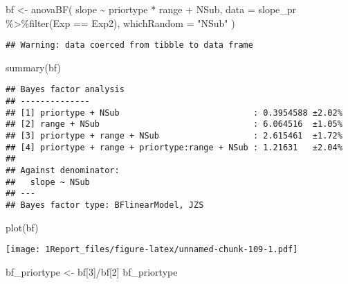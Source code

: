 \documentclass[
]{article}
\newenvironment{Shaded}{\begin{snugshade}}{\end{snugshade}}
\newcommand{\AttributeTok}[1]{\textcolor[rgb]{0.77,0.63,0.00}{#1}}
\newcommand{\DecValTok}[1]{\textcolor[rgb]{0.00,0.00,0.81}{#1}}
\newcommand{\FunctionTok}[1]{\textcolor[rgb]{0.00,0.00,0.00}{#1}}
\newcommand{\NormalTok}[1]{#1}
\newcommand{\OtherTok}[1]{\textcolor[rgb]{0.56,0.35,0.01}{#1}}
\newcommand{\SpecialCharTok}[1]{\textcolor[rgb]{0.00,0.00,0.00}{#1}}
\newcommand{\StringTok}[1]{\textcolor[rgb]{0.31,0.60,0.02}{#1}}
\begin{document}
\begin{Shaded}
\begin{Highlighting}[]
\NormalTok{bf }\OtherTok{\textless{}{-}} \FunctionTok{anovaBF}\NormalTok{( slope }\SpecialCharTok{\textasciitilde{}}\NormalTok{ priortype }\SpecialCharTok{*}\NormalTok{ range }\SpecialCharTok{+}\NormalTok{ NSub, }\AttributeTok{data =}\NormalTok{ slope\_pr }\SpecialCharTok{\%\textgreater{}\%}\FunctionTok{filter}\NormalTok{(Exp }\SpecialCharTok{==} \StringTok{\textquotesingle{}Exp2\textquotesingle{}}\NormalTok{), }\AttributeTok{whichRandom =} \StringTok{"NSub"}\NormalTok{ ) }
\end{Highlighting}
\end{Shaded}

\begin{verbatim}
## Warning: data coerced from tibble to data frame
\end{verbatim}

\begin{Shaded}
\begin{Highlighting}[]
\FunctionTok{summary}\NormalTok{(bf)}
\end{Highlighting}
\end{Shaded}

\begin{verbatim}
## Bayes factor analysis
## --------------
## [1] priortype + NSub                           : 0.3954588 ±2.02%
## [2] range + NSub                               : 6.064516  ±1.05%
## [3] priortype + range + NSub                   : 2.615461  ±1.72%
## [4] priortype + range + priortype:range + NSub : 1.21631   ±2.04%
## 
## Against denominator:
##   slope ~ NSub 
## ---
## Bayes factor type: BFlinearModel, JZS
\end{verbatim}

\begin{Shaded}
\begin{Highlighting}[]
\FunctionTok{plot}\NormalTok{(bf)}
\end{Highlighting}
\end{Shaded}

\texttt{[image: 1Report\_files/figure-latex/unnamed-chunk-109-1.pdf]}

\begin{Shaded}
\begin{Highlighting}[]
\NormalTok{ bf\_priortype }\OtherTok{\textless{}{-}}\NormalTok{ bf[}\DecValTok{3}\NormalTok{]}\SpecialCharTok{/}\NormalTok{bf[}\DecValTok{2}\NormalTok{]}
\NormalTok{ bf\_priortype}
\end{Highlighting}
\end{Shaded}
\end{document}

